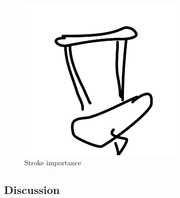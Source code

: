 \documentclass[10pt,letterpaper]{article}
\newcommand{\red}[1]{\textcolor{Red}{#1}}
\begin{document}





\begin{figure}
\includegraphics[width=\linewidth]{figures/fig_a.png}
\caption{Stroke importance} \label{stroke}
\end{figure}




\subsection{Discussion}
\end{document}
